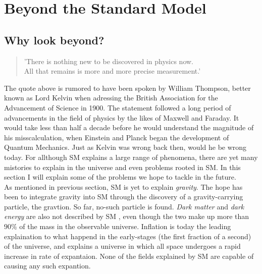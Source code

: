 \section{Beyond the Standard Model}
\subsection{Why look beyond?}
\begin{center}
    \hyphenblockcquote{UKenglish}{Kelvin}{
        'There is nothing new to be discovered in physics now.\\
        All that remains is more and more precise measurement.'
        }
\end{center}
The quote above is rumored to have been spoken by William Thompson, better
known as Lord Kelvin when adressing the British Association for the Advancement
of Science in 1900. The statement followed a long period of advancements in the
field of physics by the likes of Maxwell and Faraday. It would take less than half a decade
before he would understand the magnitude of his misscalculation, when Einstein and 
Planck began the development of Quantum Mechanics. Just as Kelvin was wrong back then, 
would he be wrong today. For allthough \ac{SM} explains a large range of phenomena,
there are yet many mistories to explain in the universe and even problems rooted in \ac{SM}.
In this section I will explain some of the problems we hope to tackle in the future. 
\\ \newline
As mentioned in previous section, \ac{SM} is yet to explain \emph{gravity}. The hope has been
to integrate gravity into \ac{SM} through the discovery of a gravity-carrying particle, 
the gravtion. So far, no-such particle is found. \emph{Dark matter} and \emph{dark energy} are 
also not described by \ac{SM} , even though the two make up more than $90\%$ of the mass in the 
observable universe. Inflation is today the leading explaination to what happend in the early-stages
(the first fraction of a second) of the universe, and explains a universe in which all space
undergoes a rapid increase in rate of expantaion. None of the fields explained by \ac{SM} are 
capable of causing any such expantion.
 